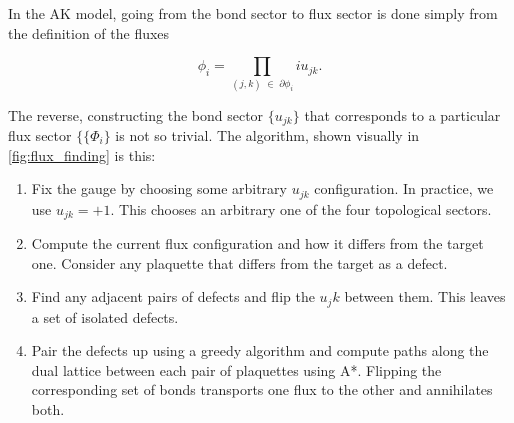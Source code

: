 In the AK model, going from the bond sector to flux sector is done simply from the definition of the fluxes

\[ \phi_i = \prod_{(j,k) \; \in \; \partial \phi_i} i u_{jk}.\]

The reverse, constructing the bond sector \(\{u_{jk}\}\) that corresponds to a particular flux sector \(\{\{\Phi_i\}\) is not so trivial. The algorithm, shown visually in \cref{fig:flux_finding} is this:

\begin{enumerate}
\def\labelenumi{\arabic{enumi}.}
\item
  Fix the gauge by choosing some arbitrary \(u_{jk}\) configuration. In practice, we use \(u_{jk} = +1\). This chooses an arbitrary one of the four topological sectors.
\item
  Compute the current flux configuration and how it differs from the target one. Consider any plaquette that differs from the target as a defect.
\item
  Find any adjacent pairs of defects and flip the \(u_jk\) between them. This leaves a set of isolated defects.
\item
  Pair the defects up using a greedy algorithm and compute paths along the dual lattice between each pair of plaquettes using A*. Flipping the corresponding set of bonds transports one flux to the other and annihilates both.
\end{enumerate}
